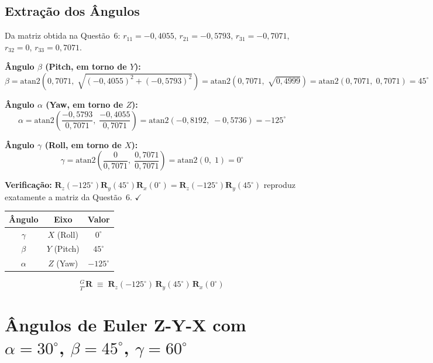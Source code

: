 \documentclass[12pt,a4paper]{article}
\newcommand{\Rx}[1]{\mathbf{R}_x(#1)}
\newcommand{\Ry}[1]{\mathbf{R}_y(#1)}
\newcommand{\Rz}[1]{\mathbf{R}_z(#1)}
\newcommand{\degr}{^{\circ}}
\begin{document}
\subsection{Extração dos Ângulos}

Da matriz obtida na Questão~6:
$r_{11}=-0{,}4055$, $r_{21}=-0{,}5793$, $r_{31}=-0{,}7071$, $r_{32}=0$, $r_{33}=0{,}7071$.

\textbf{Ângulo $\beta$ (Pitch, em torno de $Y$):}
\[
  \beta = \mathrm{atan2}\!\left(0{,}7071,\;\sqrt{(-0{,}4055)^2+(-0{,}5793)^2}\right)
        = \mathrm{atan2}\!\left(0{,}7071,\;\sqrt{0{,}4999}\right)
        = \mathrm{atan2}(0{,}7071,\;0{,}7071) = 45\degr
\]

\textbf{Ângulo $\alpha$ (Yaw, em torno de $Z$):}
\[
  \alpha = \mathrm{atan2}\!\left(\frac{-0{,}5793}{0{,}7071},\;\frac{-0{,}4055}{0{,}7071}\right)
         = \mathrm{atan2}(-0{,}8192,\;-0{,}5736) = -125\degr
\]

\textbf{Ângulo $\gamma$ (Roll, em torno de $X$):}
\[
  \gamma = \mathrm{atan2}\!\left(\frac{0}{0{,}7071},\;\frac{0{,}7071}{0{,}7071}\right)
         = \mathrm{atan2}(0,\;1) = 0\degr
\]

\textbf{Verificação:} $\Rz{-125\degr}\Ry{45\degr}\Rx{0\degr} = \Rz{-125\degr}\Ry{45\degr}$ reproduz exatamente a matriz da Questão~6. $\checkmark$

\begin{tcolorbox}[resultbox]
\begin{center}
\begin{tabular}{ccc}
  \toprule
  Ângulo & Eixo & Valor \\
  \midrule
  $\gamma$ & $X$ (Roll)  & $0\degr$ \\
  $\beta$  & $Y$ (Pitch) & $45\degr$ \\
  $\alpha$ & $Z$ (Yaw)   & $-125\degr$ \\
  \bottomrule
\end{tabular}
\end{center}
\[
  {}^{G}_{T'}\mathbf{R} \;\equiv\; \Rz{-125\degr}\,\Ry{45\degr}\,\Rx{0\degr}
\]
\end{tcolorbox}

\newpage

\section{Ângulos de Euler Z-Y-X com $\alpha=30\degr$, $\beta=45\degr$, $\gamma=60\degr$}
\end{document}
